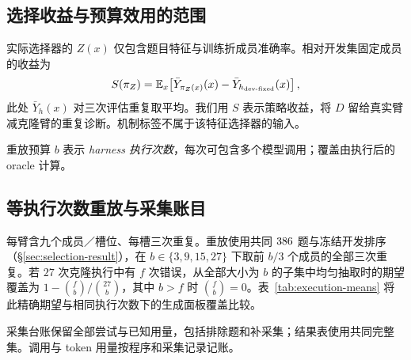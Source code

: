 \FloatBarrier
\subsection{选择收益与预算效用的范围}
实际选择器的 $Z(x)$ 仅包含题目特征与训练折成员准确率。相对开发集固定成员的收益为
\[
 S(\pi_Z)=\mathbb E_x\!\left[
 \bar Y_{\pi_Z(x)}(x)-\bar Y_{h_{\rm dev\text{-}fixed}}(x)\right],
\]
此处 $\bar Y_h(x)$ 对三次评估重复取平均。我们用 $S$ 表示策略收益，将 $D$ 留给真实臂减克隆臂的重复诊断。机制标签不属于该特征选择器的输入。

重放预算 $b$ 表示 \emph{harness 执行次数}，每次可包含多个模型调用；覆盖由执行后的 oracle 计算。

\subsection{等执行次数重放与采集账目}
每臂含九个成员／槽位、每槽三次重复。重放使用共同 $386$ 题与冻结开发排序（\S\ref{sec:selection-result}），在 $b\in\{3,9,15,27\}$ 下取前 $b/3$ 个成员的全部三次重复。若 $27$ 次克隆执行中有 $f$ 次错误，从全部大小为 $b$ 的子集中均匀抽取时的期望覆盖为 $1-\binom{f}{b}/\binom{27}{b}$，其中 $b>f$ 时 $\binom{f}{b}=0$。表~\ref{tab:execution-means} 将此精确期望与相同执行次数下的生成面板覆盖比较。

采集台账保留全部尝试与已知用量，包括排除题和补采集；结果表使用共同完整集。调用与 token 用量按程序和采集记录记账。
